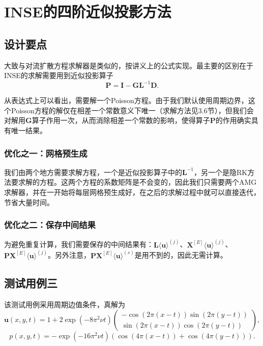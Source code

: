 \documentclass[lang=cn,10pt,bibend=bibtex]{elegantbook}
\begin{document}
\vspace{4em}

\chapter{INSE的四阶近似投影方法}

\section{设计要点}

大致与对流扩散方程求解器是类似的，按讲义上的公式实现。最主要的区别在于INSE的求解需要用到近似投影算子
\begin{equation*}
  \mathbf{P}=\mathbf{I}-\mathbf{GL}^{-1}\mathbf{D}.
\end{equation*}

从表达式上可以看出，需要解一个Poisson方程。由于我们默认使用周期边界，这个Poisson方程的解仅在相差一个常数意义下唯一（求解方法见3.6节），但我们会对解用$\mathbf{G}$算子作用一次，从而消除相差一个常数的影响，使得算子$\mathbf{P}$的作用确实具有唯一结果。

\subsection{优化之一：网格预生成}

我们由两个地方需要求解方程，一个是近似投影算子中的$\mathbf{L}^{-1}$，另一个是隐RK方法要求解的方程。这两个方程的系数矩阵是不会变的，因此我们只需要两个AMG求解器，并在一开始将每层网格预生成好，在之后的求解过程中就可以直接迭代，节省大量时间。

\subsection{优化之二：保存中间结果}

为避免重复计算，我们需要保存的中间结果有：$\mathbf{L}\langle\mathbf{u}\rangle^{(j)}$、$\mathbf{X}^{[E]}\langle\mathbf{u}\rangle^{(j)}$、$\mathbf{PX}^{[E]}\langle\mathbf{u}\rangle^{(j)}$。另外注意，$\mathbf{PX}^{[E]}\langle\mathbf{u}\rangle^{(s)}$是用不到的，因此无需计算。
\vspace{-1em}

\section{测试用例三}

该测试用例采用周期边值条件，真解为
\begin{equation*}
  \mathbf{u}(x,y,t)=1+2\exp(-8\pi^2\nu t)\left(\begin{array}{c}
    -\cos(2\pi(x-t))\sin(2\pi(y-t))\\
    \sin(2\pi(x-t))\cos(2\pi(y-t))
  \end{array}\right),
\end{equation*}
\begin{equation*}
  p(x,y,t)=-\exp(-16\pi^2\nu t)(\cos(4\pi(x-t))+\cos(4\pi(y-t))).
\end{equation*}
\end{document}
